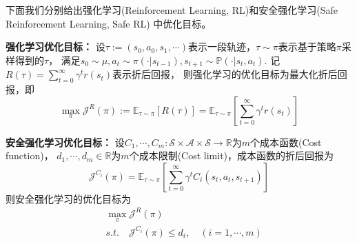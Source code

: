 \documentclass[12pt, a4paper, oneside]{ctexart}
\numberwithin{equation}{section}  %
\def\R{\mathbb{R}}          %
\def\P{\mathbb{P}}          %
\def\E{\mathbb{E}}          %
\def\S{\mathcal{S}}
\def\A{\mathcal{A}}
\def\J{\mathcal{J}}
\begin{document}
下面我们分别给出强化学习(Reinforcement Learning, RL)和安全强化学习(Safe Reinforcement Learning, Safe RL)
中优化目标。

\textbf{强化学习优化目标：}
设$\tau:=(s_0,a_0,s_1,\cdots)$表示一段轨迹，$\tau\sim\pi$表示基于策略$\pi$采样得到的$\tau$，
满足$s_0\sim\mu, a_t\sim\pi(\cdot|s_{t-1}),s_{t+1}\sim\P(\cdot|s_t,a_t)$.
记$R(\tau) = \sum_{t=0}^{\infty}\gamma^tr(s_t)$表示折后回报，
则强化学习的优化目标为最大化折后回报，即
\begin{equation}
    \max_{\pi}\J^R(\pi) := \E_{\tau\sim\pi}[R(\tau)] = \E_{\tau\sim\pi}\left[\sum_{t=0}^{\infty}\gamma^tr(s_t)\right]
\end{equation}

\textbf{安全强化学习优化目标：}
设$C_1,\cdots,C_m:\S\times \A\times \S\to\R$为$m$个成本函数(Cost function)，
$d_1,\cdots,d_m\in\R$为$m$个成本限制(Cost limit)，成本函数的折后回报为
\begin{equation}
    \J^{C_i}(\pi) = \E_{\tau\sim\pi}\left[\sum_{t=0}^{\infty}\gamma^tC_i(s_t,a_t,s_{t+1})\right]
\end{equation}
则安全强化学习的优化目标为
\begin{equation}\label{eq-safe-rl}
    \begin{aligned}
        &\ \max_{\pi}\J^R(\pi)\\
        &\ s.t.\quad \J^{C_i}(\pi)\leqslant d_i,\quad(i=1,\cdots,m)
    \end{aligned}
\end{equation}
\end{document}
